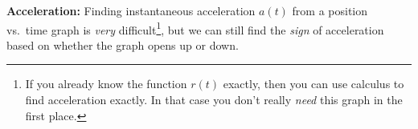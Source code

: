 %
%
%
%
\textbf{Acceleration:} Finding instantaneous acceleration $a(t)$ from a
position vs.\ time graph is \emph{very} difficult\footnote{If you already know
the function $r(t)$ exactly, then you can use calculus to find acceleration
exactly. In that case you don't really \emph{need} this graph in the first
place.}, but we can still find the \emph{sign} of acceleration based on whether
the graph opens up or down.
